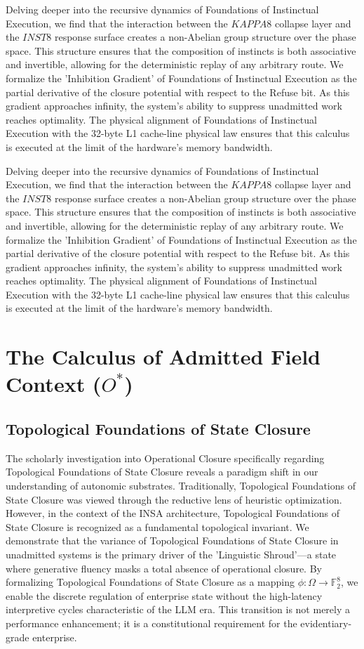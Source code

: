\documentclass[12pt,a4paper,oneside]{book}
\begin{document}
Delving deeper into the recursive dynamics of Foundations of Instinctual Execution, we find that the interaction between the $KAPPA8$ collapse layer and the $INST8$ response surface creates a non-Abelian group structure over the phase space. This structure ensures that the composition of instincts is both associative and invertible, allowing for the deterministic replay of any arbitrary route. We formalize the 'Inhibition Gradient' of Foundations of Instinctual Execution as the partial derivative of the closure potential with respect to the Refuse bit. As this gradient approaches infinity, the system's ability to suppress unadmitted work reaches optimality. The physical alignment of Foundations of Instinctual Execution with the 32-byte L1 cache-line physical law ensures that this calculus is executed at the limit of the hardware's memory bandwidth. 

Delving deeper into the recursive dynamics of Foundations of Instinctual Execution, we find that the interaction between the $KAPPA8$ collapse layer and the $INST8$ response surface creates a non-Abelian group structure over the phase space. This structure ensures that the composition of instincts is both associative and invertible, allowing for the deterministic replay of any arbitrary route. We formalize the 'Inhibition Gradient' of Foundations of Instinctual Execution as the partial derivative of the closure potential with respect to the Refuse bit. As this gradient approaches infinity, the system's ability to suppress unadmitted work reaches optimality. The physical alignment of Foundations of Instinctual Execution with the 32-byte L1 cache-line physical law ensures that this calculus is executed at the limit of the hardware's memory bandwidth. 

\chapter{The Calculus of Admitted Field Context ($O^*$)}\section{Topological Foundations of State Closure}
The scholarly investigation into Operational Closure specifically regarding Topological Foundations of State Closure reveals a paradigm shift in our understanding of autonomic substrates. Traditionally, Topological Foundations of State Closure was viewed through the reductive lens of heuristic optimization. However, in the context of the INSA architecture, Topological Foundations of State Closure is recognized as a fundamental topological invariant. We demonstrate that the variance of Topological Foundations of State Closure in unadmitted systems is the primary driver of the 'Linguistic Shroud'---a state where generative fluency masks a total absence of operational closure. By formalizing Topological Foundations of State Closure as a mapping $\phi: \Omega \to \mathbb{F}_2^8$, we enable the discrete regulation of enterprise state without the high-latency interpretive cycles characteristic of the LLM era. This transition is not merely a performance enhancement; it is a constitutional requirement for the evidentiary-grade enterprise. 
\end{document}
